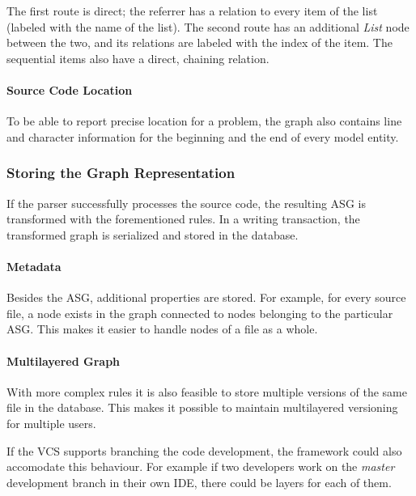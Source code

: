 The first route is direct; the referrer has a relation to every item of the list (labeled with the name of the list). The second route has an additional \emph{List} node between the two, and its relations are labeled with the index of the item. The sequential items also have a direct, chaining relation.


\paragraph{Source Code Location}
To be able to report precise location for a problem, the graph also contains line and character information for the beginning and the end of every model entity.


\subsubsection{Storing the Graph Representation}
If the parser successfully processes the source code, the resulting ASG is transformed with the forementioned rules. In a writing transaction, the transformed graph is serialized and stored in the database.

\paragraph{Metadata}
Besides the ASG, additional properties are stored. For example, for every source file, a node exists in the graph connected to nodes belonging to the particular ASG. This makes it easier to handle nodes of a file as a whole.

\paragraph{Multilayered Graph}
With more complex rules it is also feasible to store multiple versions of the same file in the database. This makes it possible to maintain multilayered versioning for multiple users.

If the VCS supports branching the code development, the framework could also accomodate this behaviour. For example if two developers work on the \emph{master} development branch in their own IDE, there could be layers for each of them.


